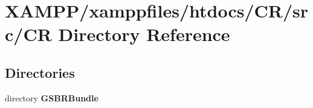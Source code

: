 \section{X\+A\+M\+P\+P/xamppfiles/htdocs/\+C\+R/src/\+C\+R Directory Reference}
\label{dir_4c19ccea950ec168e288f80dca7428a1}
\subsection*{Directories}
\begin{DoxyCompactItemize}
\item 
directory {\bf G\+S\+B\+R\+Bundle}
\end{DoxyCompactItemize}
